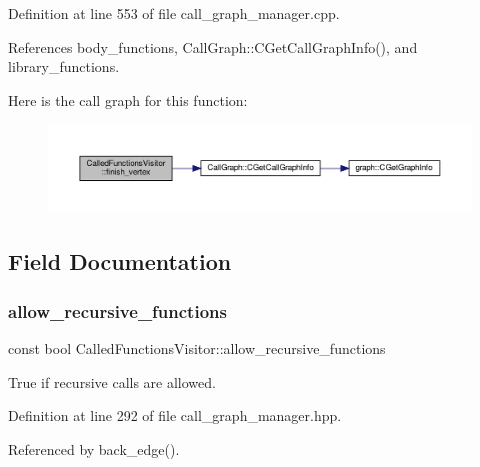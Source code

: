 Definition at line 553 of file call\+\_\+graph\+\_\+manager.\+cpp.



References body\+\_\+functions, Call\+Graph\+::\+C\+Get\+Call\+Graph\+Info(), and library\+\_\+functions.

Here is the call graph for this function\+:
\nopagebreak
\begin{figure}[H]
\begin{center}
\leavevmode
\includegraphics[width=350pt]{d6/da4/structCalledFunctionsVisitor_a641abe95937af8e1d2fbafcc5b27a098_cgraph}
\end{center}
\end{figure}


\subsection{Field Documentation}
\mbox{\label{structCalledFunctionsVisitor_adacde9fcc83c0f8944a62e307b706a12}} 
\subsubsection{\texorpdfstring{allow\+\_\+recursive\+\_\+functions}{allow\_recursive\_functions}}
{\footnotesize\ttfamily const bool Called\+Functions\+Visitor\+::allow\+\_\+recursive\+\_\+functions\hspace{0.3cm}{\ttfamily [private]}}



True if recursive calls are allowed. 



Definition at line 292 of file call\+\_\+graph\+\_\+manager.\+hpp.



Referenced by back\+\_\+edge().

\mbox{\label{structCalledFunctionsVisitor_a247b847cc5d88746e63c54d0297048d3}} 
